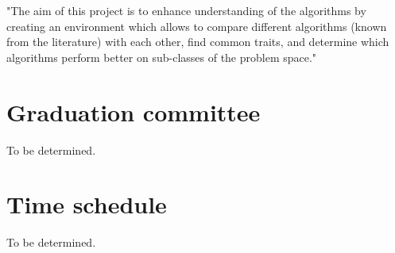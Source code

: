\documentclass[11pt]{article}
\begin{document}
"The aim of this project is to enhance understanding of the algorithms by creating an environment which allows to compare different algorithms (known from the literature) with each other, find common traits, and determine which algorithms perform better on sub-classes of the problem space."



\section{Graduation committee}
To be determined.

\section{Time schedule}
To be determined.



\end{document}
